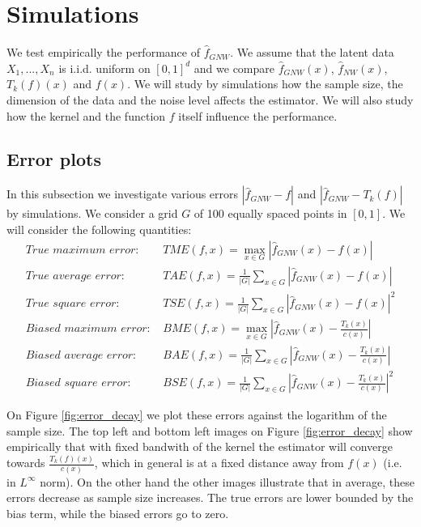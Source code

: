 \documentclass{article}
\begin{document}
\section{Simulations}

We test empirically the performance of $\hat{f}_{GNW}$. We assume that the latent data $X_1,...,X_n$ is i.i.d. uniform on $[0,1]^d$ and we compare $\hat{f}_{GNW}(x)$, $\hat{f}_{NW}(x)$, $T_k(f)(x)$ and $f(x)$.
We will study by simulations how the sample size, the dimension of the data and the noise level affects the estimator. We will also study how the kernel and the function $f$ itself influence the performance.

\subsection{Error plots}
In this subsection we investigate various errors
$|\hat{f}_{GNW}-f|$ and $|\hat{f}_{GNW}-T_k(f)|$ by simulations.
We consider a grid $G$ 
of 100 equally spaced points in $[0,1]$.
We will consider the following quantities:
\begin{equation*}
    \begin{split}
    \textit{True maximum error: }
    &
    TME(f,x)=\max_{x\in G}|\hat{f}_{GNW}(x)-f(x)|\\
    \textit{True average error: } &
    TAE(f,x)=\frac{1}{|G|}\sum_{x\in G}|\hat{f}_{GNW}(x)-f(x)|\\
    \textit{True square error: } &
    TSE(f,x)=\frac{1}{|G|}\sum_{x\in G}|\hat{f}_{GNW}(x)-f(x)|^2\\
    \textit{Biased maximum error: }
    &
    BME(f,x)=\max_{x\in G}|\hat{f}_{GNW}(x)-\frac{T_k(x)}{c(x)}|\\
    \textit{Biased average error: } 
    &
    BAE(f,x)=\frac{1}{|G|}\sum_{x\in G}|\hat{f}_{GNW}(x)-\frac{T_k(x)}{c(x)}|\\
    \textit{Biased square error: }
    &
    BSE(f,x)=\frac{1}{|G|}\sum_{x\in G}|\hat{f}_{GNW}(x)-\frac{T_k(x)}{c(x)}|^2
    \end{split}
\end{equation*}

On Figure \ref{fig:error_decay} we plot these errors against the logarithm of the sample size. The top left
and bottom left 
images 
on Figure \ref{fig:error_decay} show empirically that with fixed bandwith  of the kernel the estimator will converge towards $\frac{T_k(f)(x)}{c(x)}$, which in general is at a fixed distance away from $f(x)$ (i.e. in $L^{\infty}$ norm). On the other hand the other images illustrate that in average, these errors decrease as sample size increases. The true errors are lower bounded by the bias term, while the biased errors go to zero.
\end{document}
